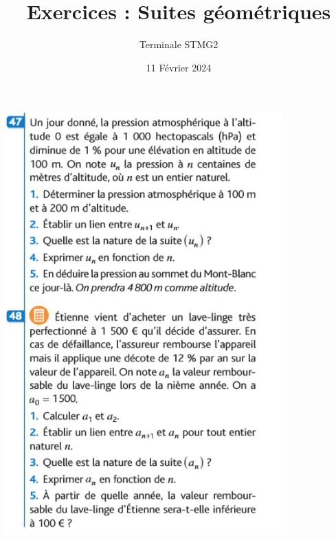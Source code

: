 \documentclass{article}
\title{Exercices : Suites géométriques}
\author{Terminale STMG2}
\date{11 Février 2024}
\begin{document}
\maketitle

\begin{center}
\includegraphics[width=0.8\textwidth]{Exercices_suites_geometrique.png}
\end{center}
\end{document}
